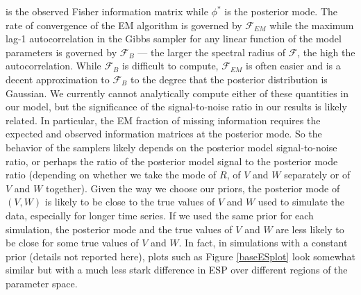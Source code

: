 \documentclass{article}
\begin{document}
is the observed Fisher information matrix while $\phi^*$ is the posterior mode. The rate of convergence of the EM algorithm is governed by $\mathcal{F}_{EM}$ while the maximum lag-1 autocorrelation in the Gibbs sampler for any linear function of the model parameters is governed by $\mathcal{F}_{B}$ --- the larger the spectral radius of $\mathcal{F}$, the high the autocorrelation. While $\mathcal{F}_{B}$ is difficult to compute, $\mathcal{F}_{EM}$ is often easier and is a decent approximation to $\mathcal{F}_{B}$ to the degree that the posterior distribution is Gaussian. We currently cannot analytically compute either of these quantities in our model, but the significance of the signal-to-noise ratio in our results is likely related. In particular, the EM fraction of missing information requires the expected and observed information matrices at the posterior mode. So the behavior of the samplers likely depends on the posterior model signal-to-noise ratio, or perhaps the ratio of the posterior model signal to the posterior mode ratio (depending on whether we take the mode of $R$, of $V$ and $W$ separately or of $V$ and $W$ together). Given the way we choose our priors, the posterior mode of $(V,W)$ is likely to be close to the true values of $V$ and $W$ used to simulate the data, especially for longer time series. If we used the same prior for each simulation, the posterior mode and the true values of $V$ and $W$ are less likely to be close for some true values of $V$ and $W$. In fact, in simulations with a constant prior (details not reported here), plots such as Figure \ref{baseESplot} look somewhat similar but with a much less stark difference in ESP over different regions of the parameter space.


\clearpage

\end{document}
